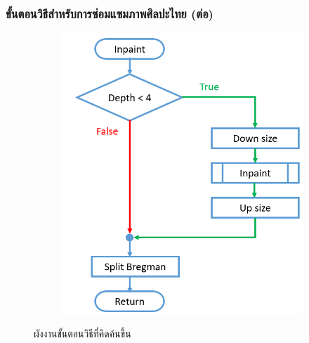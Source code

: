 \documentclass[xcolor=dvipsnames, xetex,serif]{beamer}
\numberwithin{equation}{section}
\begin{document}
	\begin{frame}
		\frametitle{ขั้นตอนวิธีสำหรับการซ่อมแซมภาพศิลปะไทย (ต่อ)}
		\begin{figure}[H]
			\centering
			\begin{subfigure}{0.5\linewidth}
				\centering
				\includegraphics[width=1\linewidth]{images/method_thaiart/flowchart_thaiart.png}
			\end{subfigure}
			\caption{ผังงานขั้นตอนวิธีที่คิดค้นขึ้น}
		\end{figure}
	\end{frame}
\end{document}
